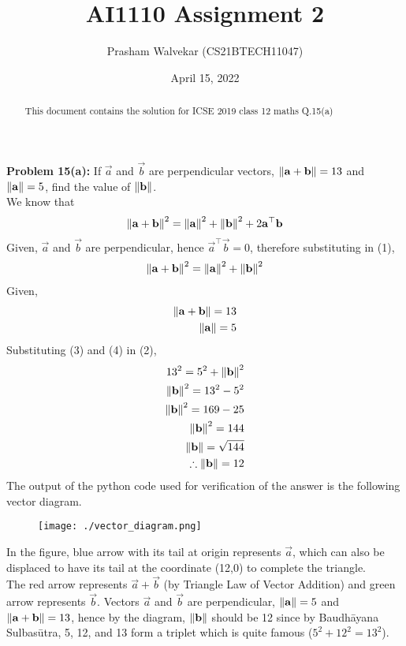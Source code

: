 \documentclass[journal,12pt,twocolumn]{IEEEtran}
\begin{document}
     \def\centbox#1{\makebox[0in]{#1}}
     \def\topbox#1{\raisebox{-\baselineskip}[0in][0in]{#1}}
     \def\midbox#1{\raisebox{-0.5\baselineskip}[0in][0in]{#1}}
\vspace{3cm}
\setlength{\columnsep}{0.70cm}
\title{\Huge{\textbf{AI1110 Assignment 2}}}
\author{Prasham Walvekar (CS21BTECH11047)}
\date{April 15, 2022}
\maketitle
\newpage
\bigskip
\begin{abstract}
This document contains the solution for ICSE 2019 class 12 maths Q.15(a)  
\end{abstract}
\textbf{\large{Problem 15(a):}} \large{If \(\vec{a}\) and \(\vec{b}\) are perpendicular vectors,  $\left\lVert\mathbf{a}+\mathbf{b}\right\rVert  = 13 $ and $\left\lVert\mathbf{a}\right\rVert = 5$, find the value of $\left\lVert\mathbf{b}\right\rVert $.}\\
\solution
We know that
\begin{align}
\left\lVert\mathbf{a}+\mathbf{b}\right\rVert^2 = \left\lVert\mathbf{a}\right\rVert^2 + \left\lVert\mathbf{b}\right\rVert^2 + 2 \mathbf{a}^{\top}\mathbf{b}
\end{align}
Given, $\vec{a}$ and $\vec{b}$ are perpendicular, hence $\vec{a}^{\top}\vec{b}=0$, therefore substituting in (1),
\begin{align}
\left\lVert\mathbf{a}+\mathbf{b}\right\rVert^2 = \left\lVert\mathbf{a}\right\rVert^2 + \left\lVert\mathbf{b}\right\rVert^2
\end{align}
Given,
\begin{align}
\left\lVert\mathbf{a}+\mathbf{b}\right\rVert = 13\\
\left\lVert\mathbf{a}\right\rVert = 5
\end{align}
Substituting (3) and (4) in (2),
\begin{align}
13^2 = 5^2 + \left\lVert\mathbf{b}\right\rVert^2\\
\left\lVert\mathbf{b}\right\rVert^2 = 13^2 - 5^2\\
\left\lVert\mathbf{b}\right\rVert^2 = 169 - 25\\ 
\left\lVert\mathbf{b}\right\rVert^2 = 144\\
\left\lVert\mathbf{b}\right\rVert = \sqrt{144}\\
\therefore \left\lVert\mathbf{b}\right\rVert = 12
\end{align}
The output of the python code used for verification of the answer is the following vector diagram.
\begin{figure}[!ht]
	\centering
	\texttt{[image: ./vector\_diagram.png]}
	\end{figure}
In the figure, blue arrow with its tail at origin represents $\vec{a}$, which can also be displaced to have its tail at the coordinate (12,0) to complete the triangle.\\
The red arrow represents $\vec{a}+\vec{b}$ (by Triangle Law of Vector Addition) and green arrow represents $\vec{b}$. Vectors $\vec{a}$ and $\vec{b}$ are perpendicular, $\left\lVert\mathbf{a}\right\rVert = 5$ and $\left\lVert\mathbf{a}+\mathbf{b}\right\rVert = 13$, hence by the diagram, $\left\lVert\mathbf{b}\right\rVert$ should be 12 since by Baudhāyana Sulbasūtra, 5, 12, and 13 form a triplet which is quite famous ($5^2+12^2=13^2$).
\end{document}
